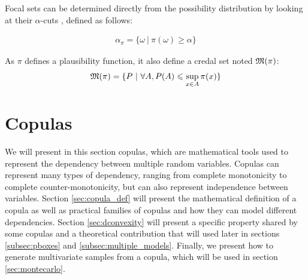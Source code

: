 Focal sets can be determined directly from the possibility distribution by looking at their \( \alpha \)-cuts \cite{destercke_unifying_2008}, defined as follows:

\begin{align}
    \alpha_\pi=\{\omega~|~\pi(\omega)\geqslant\alpha\} \label{eq:alpha_cut}   
\end{align}

As \( \pi \) defines a plausibility function, it also define a credal set noted \( {\mathfrak{M}}(\pi) \):
\begin{align}
    {\mathfrak{M}}(\pi)=\{P~|~\forall A, P(A)\leqslant \sup_{x\in A}\pi(x)\}\label{eq:credal_set_possibility}
\end{align}

\section{Copulas}\label{sec:copulas}
We will present in this section copulas, which are mathematical tools used to represent the dependency between multiple random variables. Copulas can represent many types of dependency, ranging from complete monotonicity to complete counter-monotonicity, but can also represent independence between variables. Section \ref{sec:copula_def} will present the mathematical definition of a copula as well as practical families of copulas and how they can model different dependencies. Section \ref{sec:dconvexity} will present a specific property shared by some copulas and a theoretical contribution that will used later in sections \ref{subsec:pboxes} and \ref{subsec:multiple_models}. Finally, we present how to generate multivariate samples from a copula, which will be used in section \ref{sec:montecarlo}.

